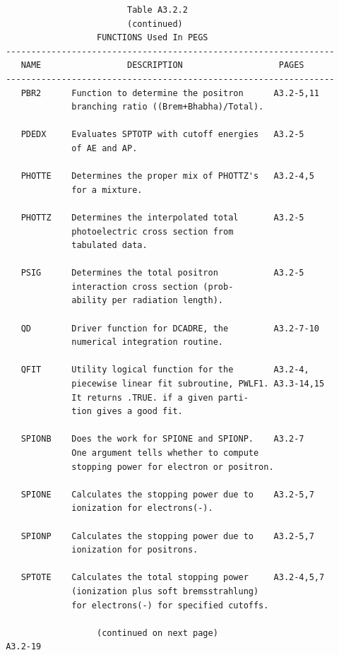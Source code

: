 \newpage {} \begin{verbatim}
                         Table A3.2.2
                         (continued)
                   FUNCTIONS Used In PEGS
 -----------------------------------------------------------------
    NAME                 DESCRIPTION                   PAGES
 -----------------------------------------------------------------
    PBR2      Function to determine the positron      A3.2-5,11
              branching ratio ((Brem+Bhabha)/Total).

    PDEDX     Evaluates SPTOTP with cutoff energies   A3.2-5
              of AE and AP.

    PHOTTE    Determines the proper mix of PHOTTZ's   A3.2-4,5
              for a mixture.

    PHOTTZ    Determines the interpolated total       A3.2-5
              photoelectric cross section from
              tabulated data.

    PSIG      Determines the total positron           A3.2-5
              interaction cross section (prob-
              ability per radiation length).

    QD        Driver function for DCADRE, the         A3.2-7-10
              numerical integration routine.

    QFIT      Utility logical function for the        A3.2-4,
              piecewise linear fit subroutine, PWLF1. A3.3-14,15
              It returns .TRUE. if a given parti-
              tion gives a good fit.

    SPIONB    Does the work for SPIONE and SPIONP.    A3.2-7
              One argument tells whether to compute
              stopping power for electron or positron.

    SPIONE    Calculates the stopping power due to    A3.2-5,7
              ionization for electrons(-).

    SPIONP    Calculates the stopping power due to    A3.2-5,7
              ionization for positrons.

    SPTOTE    Calculates the total stopping power     A3.2-4,5,7
              (ionization plus soft bremsstrahlung)
              for electrons(-) for specified cutoffs.

                   (continued on next page)
 A3.2-19
\end{verbatim}
